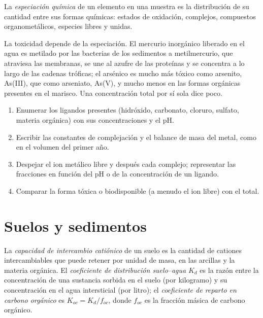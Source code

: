 \begin{definition}[Especiación]\label{def:b3:environmental-toxicology:speciation}
La \emph{especiación química} de un elemento en una
muestra es la distribución de su cantidad entre sus formas químicas: estados de
oxidación, complejos, compuestos organometálicos, especies libres y unidas.
\end{definition}

La toxicidad depende de la especiación. El mercurio inorgánico liberado en el agua es
metilado por las bacterias de los sedimentos a metilmercurio, que atraviesa las membranas,
se une al azufre de las proteínas y se concentra a lo largo de las cadenas tróficas; el arsénico es mucho más
tóxico como arsenito, As(III), que como arseniato, As(V), y mucho menos en las formas orgánicas
presentes en el marisco. Una concentración total por sí sola dice poco.

\begin{method}\label{met:b3:environmental-toxicology:speciation}
\begin{enumerate}
  \item Enumerar los ligandos presentes (hidróxido, carbonato, cloruro, sulfato, materia
        orgánica) con sus concentraciones y el pH.
  \item Escribir las constantes de complejación y el balance de masa del metal, como en el
        volumen del primer año.
  \item Despejar el ion metálico libre y después cada complejo; representar las fracciones en función
        del pH o de la concentración de un ligando.
  \item Comparar la forma tóxica o biodisponible (a menudo el ion libre) con el total.
\end{enumerate}
\end{method}

\section{Suelos y sedimentos}

\begin{definition}\label{def:b3:environmental-toxicology:soil}
La \emph{capacidad de intercambio catiónico} de un suelo es
la cantidad de cationes intercambiables que puede retener por unidad de masa, en las arcillas y la materia
orgánica. El \emph{coeficiente de distribución suelo--agua}
$K_d$ es la razón entre la concentración de una sustancia
sorbida en el suelo (por kilogramo) y su concentración en el agua intersticial (por
litro); el \emph{coeficiente de reparto en carbono orgánico}
es $K_{oc} = K_d/f_{oc}$, donde $f_{oc}$ es la fracción másica de carbono orgánico.
\end{definition}

